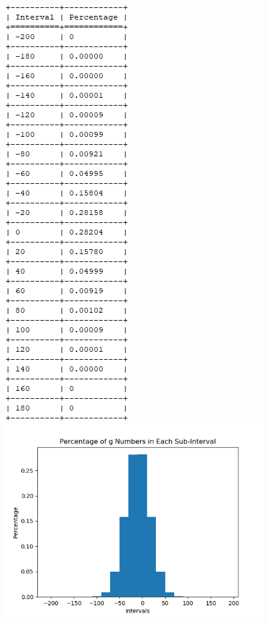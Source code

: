\documentclass[12pt]{article}
\begin{document}
\begin{figure}[h]
	\begin{center}
		\includegraphics*[scale=.75]{percList.png}
		\includegraphics*[scale=.5]{hw2-1histA.png}
	\end{center}
\end{figure}
\end{document}
